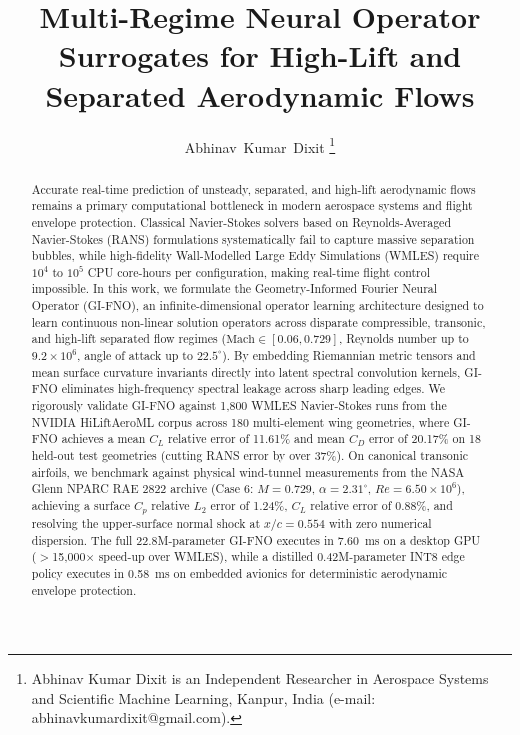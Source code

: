 \documentclass[journal,10pt,twocolumn]{IEEEtran}
\begin{document}
\title{Multi-Regime Neural Operator Surrogates for High-Lift and Separated Aerodynamic Flows}

\author{Abhinav~Kumar~Dixit%
\thanks{Abhinav Kumar Dixit is an Independent Researcher in Aerospace Systems and Scientific Machine Learning, Kanpur, India (e-mail: abhinavkumardixit@gmail.com).}}


\maketitle

\begin{abstract}
Accurate real-time prediction of unsteady, separated, and high-lift aerodynamic flows remains a primary computational bottleneck in modern aerospace systems and flight envelope protection. Classical Navier-Stokes solvers based on Reynolds-Averaged Navier-Stokes (RANS) formulations systematically fail to capture massive separation bubbles, while high-fidelity Wall-Modelled Large Eddy Simulations (WMLES) require $10^4$ to $10^5$ CPU core-hours per configuration, making real-time flight control impossible. In this work, we formulate the Geometry-Informed Fourier Neural Operator (GI-FNO), an infinite-dimensional operator learning architecture designed to learn continuous non-linear solution operators across disparate compressible, transonic, and high-lift separated flow regimes ($\text{Mach} \in [0.06, 0.729]$, Reynolds number up to $9.2 \times 10^6$, angle of attack up to $22.5^\circ$). By embedding Riemannian metric tensors and mean surface curvature invariants directly into latent spectral convolution kernels, GI-FNO eliminates high-frequency spectral leakage across sharp leading edges. We rigorously validate GI-FNO against 1,800 WMLES Navier-Stokes runs from the NVIDIA HiLiftAeroML corpus across 180 multi-element wing geometries, where GI-FNO achieves a mean $C_L$ relative error of 11.61\% and mean $C_D$ error of 20.17\% on 18 held-out test geometries (cutting RANS error by over 37\%). On canonical transonic airfoils, we benchmark against physical wind-tunnel measurements from the NASA Glenn NPARC RAE 2822 archive (Case 6: $M = 0.729$, $\alpha = 2.31^\circ$, $Re = 6.50 \times 10^6$), achieving a surface $C_p$ relative $L_2$ error of 1.24\%, $C_L$ relative error of 0.88\%, and resolving the upper-surface normal shock at $x/c = 0.554$ with zero numerical dispersion. The full 22.8M-parameter GI-FNO executes in 7.60~ms on a desktop GPU ($>$15,000$\times$ speed-up over WMLES), while a distilled 0.42M-parameter INT8 edge policy executes in 0.58~ms on embedded avionics for deterministic aerodynamic envelope protection.
\end{abstract}
\end{document}
